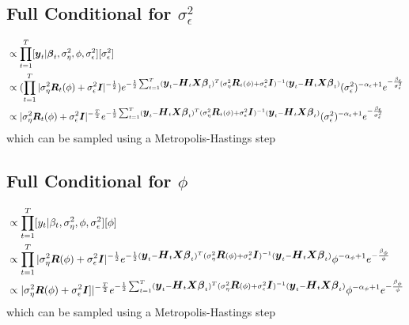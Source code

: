 \documentclass[fleqn]{article}
\def\bm#1{\mbox{\boldmath $#1$}}
\begin{document}
\subsection{Full Conditional for $\sigma^2_\epsilon$}
%
\begin{align*}
[\sigma^2_\epsilon | \cdot] & \propto \prod_{t = 1}^T [\bm{y}_t | \bm{\beta}_t, \sigma^2_\eta, \phi, \sigma^2_\epsilon] [\sigma^2_\epsilon]\\
%
& \propto (\prod_{t = 1}^T |\sigma^2_\eta \bm{R}_t(\phi) + \sigma^2_\epsilon \bm{I} |^{ - \frac{1} {2}}) e^{ - \frac{1} {2} \sum_{t = 1}^T (\bm{y}_t - \bm{H}_t \bm{X} \bm{\beta}_t)^T (\sigma^2_\eta \bm{R}_t(\phi) + \sigma^2_\epsilon \bm{I})^{ - 1} (\bm{y}_t - \bm{H}_t \bm{X} \bm{\beta}_t)} (\sigma^2_\epsilon)^{ - \alpha_\epsilon + 1} e^{ - \frac{\beta_\epsilon} {\sigma^2_\epsilon}}\\
%
& \propto |\sigma^2_\eta \bm{R}_t(\phi) + \sigma^2_\epsilon \bm{I} |^{ - \frac{T} {2}} e^{ - \frac{1} {2} \sum_{t = 1}^T (\bm{y}_t - \bm{H}_t \bm{X} \bm{\beta}_t)^T (\sigma^2_\eta \bm{R}_t(\phi) + \sigma^2_\epsilon \bm{I})^{ - 1} (\bm{y}_t - \bm{H}_t \bm{X} \bm{\beta}_t)} (\sigma^2_\epsilon)^{ - \alpha_\epsilon + 1} e^{ - \frac{\beta_\epsilon} {\sigma^2_\epsilon}}\\
\end{align*}
% 
which can be sampled using a Metropolis-Hastings step
%
\subsection{Full Conditional for $\phi$}
%
\begin{align*}
  [\phi | \cdot] & \propto \prod_{t = 1}^T [y_t | \beta_t, \sigma^2_\eta, \phi, \sigma^2_\epsilon] [\phi]\\
%
& \propto \prod_{t = 1}^T | \sigma^2_\eta \bm{R}(\phi) + \sigma^2_\epsilon \bm{I} |^{ - \frac{1} {2}} e^{ - \frac{1} {2} (\bm{y}_t - \bm{H}_t \bm{X} \bm{\beta}_t)^T (\sigma^2_\eta \bm{R}(\phi) + \sigma^2_\epsilon \bm{I})^{ - 1} (\bm{y}_t - \bm{H}_t \bm{X} \bm{\beta}_t)} \phi^{ - \alpha_\phi + 1} e^{ - \frac{\beta_\phi} {\phi}}\\
%
& \propto | \sigma^2_\eta \bm{R}(\phi) + \sigma^2_\epsilon \bm{I}  ]|^{ - \frac{T} {2}} e^{ - \frac{1} {2} \sum_{t = 1}^T (\bm{y}_t - \bm{H}_t \bm{X} \bm{\beta}_t)^T (\sigma^2_\eta \bm{R}(\phi) + \sigma^2_\epsilon \bm{I})^{ - 1} (\bm{y}_t - \bm{H}_t \bm{X} \bm{\beta}_t)} \phi^{ - \alpha_\phi + 1} e^{ - \frac{\beta_\phi} {\phi}}\\
\end{align*}
% 
which can be sampled using a Metropolis-Hastings step
%
\end{document}
